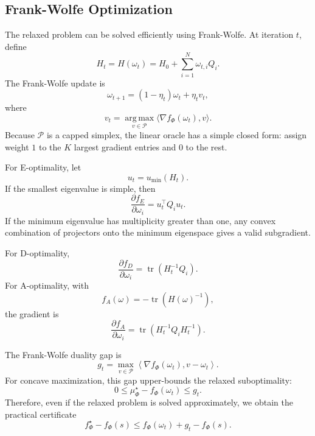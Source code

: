 \documentclass[letterpaper, 9
 pt, conference]{ieeeconf}
\begin{document}
\subsection{Frank-Wolfe Optimization}
\label{subsec:frank_wolfe}

The relaxed problem can be solved efficiently using Frank-Wolfe. At iteration $t$, define
\begin{equation}
    H_t
    =
    H(\omega_t)
    =
    H_0+\sum_{i=1}^{N}\omega_{t,i}Q_i.
\end{equation}
The Frank-Wolfe update is
\begin{equation}
    \omega_{t+1}
    =
    (1-\eta_t)\omega_t+\eta_t v_t,
\end{equation}
where
\begin{equation}
    v_t
    =
    \operatorname*{arg\,max}_{v\in\mathcal{P}}
    \langle \nabla f_\Phi(\omega_t),v\rangle.
\end{equation}
Because $\mathcal{P}$ is a capped simplex, the linear oracle has a simple closed form: assign weight $1$ to the $K$ largest gradient entries and $0$ to the rest.

For E-optimality, let
\begin{equation}
    u_t=u_{\min}(H_t).
\end{equation}
If the smallest eigenvalue is simple, then
\begin{equation}
    \frac{\partial f_E}{\partial \omega_i}
    =
    u_t^\top Q_i u_t.
\end{equation}
If the minimum eigenvalue has multiplicity greater than one, any convex combination of projectors onto the minimum eigenspace gives a valid subgradient.

For D-optimality,
\begin{equation}
    \frac{\partial f_D}{\partial \omega_i}
    =
    \operatorname{tr}(H_t^{-1}Q_i).
\end{equation}
For A-optimality, with
\begin{equation}
    f_A(\omega)
    =
    -
    \operatorname{tr}(H(\omega)^{-1}),
\end{equation}
the gradient is
\begin{equation}
    \frac{\partial f_A}{\partial \omega_i}
    =
    \operatorname{tr}
    \left(
    H_t^{-1}Q_iH_t^{-1}
    \right).
\end{equation}

The Frank-Wolfe duality gap is
\begin{equation}
    g_t
    =
    \max_{v\in\mathcal{P}}
    \left\langle
    \nabla f_\Phi(\omega_t),
    v-\omega_t
    \right\rangle.
\end{equation}
For concave maximization, this gap upper-bounds the relaxed suboptimality:
\begin{equation}
    0
    \leq
    \mu_\Phi^\star-f_\Phi(\omega_t)
    \leq
    g_t.
\end{equation}
Therefore, even if the relaxed problem is solved approximately, we obtain the practical certificate
\begin{equation}
    f_\Phi^\star-f_\Phi(s)
    \leq
    f_\Phi(\omega_t)+g_t-f_\Phi(s).
\end{equation}
\end{document}
